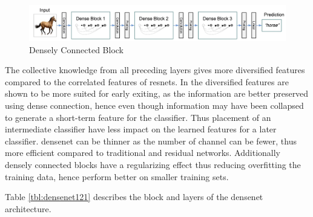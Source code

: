 \begin{figure}
	\centering
	\includegraphics[width=\linewidth]{figures/models/densenet}
	\caption[Densely Connected Block]{Densely Connected Block}
	\label{fig:densenet}
\end{figure}

The collective knowledge from all preceding layers gives more diversified features compared to the correlated features of \gls{resnet}s. In \cite{huang_multi-scale_2017} the diversified features are shown to be more suited for early exiting,  as the information are better preserved using dense connection, hence even though information may have been collapsed to generate a short-term feature for the classifier. Thus placement of an intermediate classifier have less impact on the learned features for a later classifier. \gls{densenet} can be thinner as the number of channel can be fewer, thus more efficient compared to traditional and residual networks. Additionally densely connected blocks have a regularizing effect thus reducing overfitting the training data, hence perform better on smaller training sets. 

Table \ref{tbl:densenet121} describes the block and layers of the \gls{densenet} architecture. 

